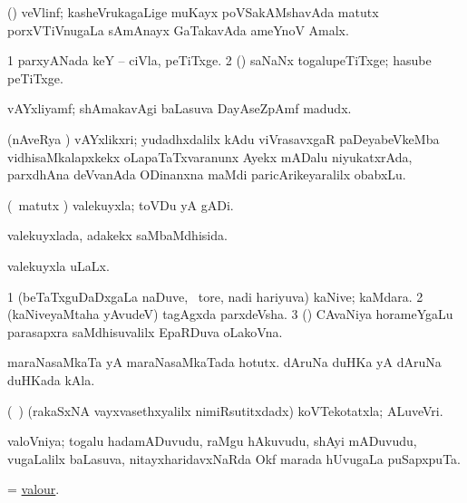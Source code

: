 \bentry
{} 
\gl{\nA}
\expl{}
\bmng
 (\jiVra) veVlinf; kasheVrukagaLige muKayx poVSakAMshavAda matutx porxVTiVnugaLa sAmAnayx GaTakavAda ameYnoV Amalx. 
\emng
\eentry

\bentry
{} 
\gl{\nA}
\expl{}
\bmng
\bnum
\num{1} parxyANada keY -- ciVla, peTiTxge. 
\num{2} (\ame) saNaNx togalupeTiTxge; hasube peTiTxge. 
\enum
\emng
\eentry

\bentry
{} 
\gl{\nA}
\expl{(\P)}
\bmng
vAYxliyamf; shAmakavAgi baLasuva DayAseZpAmf madudx. 
\emng
\eentry

\bentry
{} 
\gl{\nA}
\expl{}
\bmng
 (nAveRya \pu) vAYxlikxri; yudadhxdalilx kAdu viVrasavxgaR paDeyabeVkeMba vidhisaMkalapxkekx oLapaTaTxvaranunx Ayekx mADalu niyukatxrAda, parxdhAna deVvanAda ODinanxna  maMdi paricArikeyaralilx obabxLu. 
\emng
\eentry

\bentry
{} 
\gl{\nA}
\bmng
(\aMrashA\ matutx \savi) valekuyxla; toVDu yA gADi. 
\emng
\eentry

\bentry
{} 
\gl{\gu}
\expl{}
\bmng
valekuyxlada, adakekx saMbaMdhisida. 
\emng
\eentry

\bentry
{} 
\gl{\gu}
\expl{}
\bmng
valekuyxla uLaLx. 
\emng
\eentry

\bentry
{} 
\gl{\nA}
\bmng
\bnum
\num{1} (beTaTxguDaDxgaLa naDuve, \sA\ tore, nadi hariyuva) kaNive; kaMdara. 
\num{2} (kaNiveyaMtaha yAvudeV) tagAgxda parxdeVsha. 
\num{3} (\vAshi) CAvaNiya horameYgaLu parasapxra saMdhisuvalilx EpaRDuva oLakoVna. 
\enum
\emng

\noindent 
\gl{\pagu}
\expl{}
\bmng
\banum
{} maraNasaMkaTa yA maraNasaMkaTada hotutx. 
 dAruNa duHKa yA dAruNa duHKada kAla. 
\eanum
\emng
\eentry

\bentry 
{} 
\gl{\nA}
\expl{}
\bmng
 (\roV\ \pArxca) (rakaSxNA vayxvasethxyalilx nimiRsutitxdadx) koVTekotatxla; ALuveVri. 
\emng
\eentry

\bentry
{} 
\gl{\nA}
\expl{}
\bmng
 valoVniya; togalu hadamADuvudu, raMgu hAkuvudu, shAyi mADuvudu, \mo vugaLalilx baLasuva, nitayxharidavxNaRda Okf marada hUvugaLa puSapxpuTa. 
\emng
\eentry

\bentry
{} 
\gl{\nA}
\expl{}
\bmng
 = \hyperlink{valour}{valour}. 
\emng
\eentry

